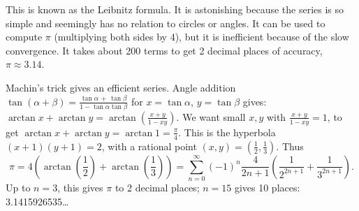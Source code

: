 \documentclass[11pt]{article}
\newcommand{\ts}{\textstyle}
\begin{document}
This is known as the Leibnitz formula. It is astonishing because the series is so simple and 
seemingly has no relation to circles or angles.
It can be used to compute $\pi$ (multiplying both sides by 4),
but it is inefficient because of the slow convergence. It takes about 200 terms to get 2 decimal places of accuracy, $\pi\approx 3.14$. 

Machin's trick gives an efficient series.
Angle addition $\tan(\alpha+\beta) = \frac{\tan\alpha \, +\, \tan\beta}{1-\tan\alpha\tan\beta}$
for $x=\tan\alpha$, $y=\tan\beta$ gives: 
$\ts \arctan x + \arctan y = \arctan(\frac{x+y}{1-xy}).$
We want small $x,y$ with $\frac{x+y}{1-xy} = 1$, to get $\arctan x + \arctan y = \arctan 1 = \frac\pi4$.
This is the hyperbola $(x{+}1)(y{+}1) = 2$, with a rational point $(x,y) = (\frac12,\frac13)$. Thus
$$\ts
\pi = 4\left(\arctan(\frac12) + \arctan(\frac13)\right) = \sum\limits_{n=0}^\infty (-1)^n \frac{4}{2n+1}(\frac1{2^{2n+1}} + \frac1{3^{2n+1}}).
$$
Up to $n=3$, this gives $\pi$ to 2 decimal places; $n=15$ gives 10 places:
3.1415926535\ldots
\end{document}
